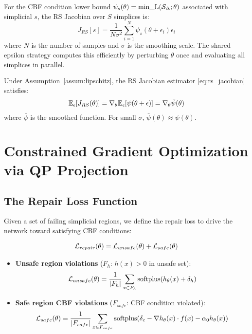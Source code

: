 \begin{protocol}
    \label{prot:rs_jacobian}
    For the CBF condition lower bound $\psi_s(\theta) = \text{min\_L}(\mathcal{S}_\Delta; \theta)$ associated with simplicial $s$, the RS Jacobian over $S$ simplices is:
    \begin{equation}
        J_{RS}[s] = \frac{1}{N \sigma^2} \sum_{i=1}^N \psi_s(\theta + \epsilon_i) \epsilon_i
        \label{eq:rs_cbf_jacobian}
    \end{equation}
    where $N$ is the number of samples and $\sigma$ is the smoothing scale. The shared epsilon strategy computes this efficiently by perturbing $\theta$ once and evaluating all simplices in parallel.
\end{protocol}

\begin{property}
    Under Assumption~\ref{assum:lipschitz}, the RS Jacobian estimator \eqref{eq:rs_jacobian} satisfies:
    \begin{equation}
        \mathbb{E}_\epsilon[J_{RS}(\theta)] = \nabla_\theta \mathbb{E}_\epsilon[\psi(\theta + \epsilon)] = \nabla_\theta \bar{\psi}(\theta)
        \label{eq:rs_unbiased}
    \end{equation}
    where $\bar{\psi}$ is the smoothed function. For small $\sigma$, $\bar{\psi}(\theta) \approx \psi(\theta)$.
\end{property}

\section{Constrained Gradient Optimization via QP Projection}

\subsection{The Repair Loss Function}

Given a set of failing simplicial regions, we define the repair loss to drive the network toward satisfying CBF conditions:

\begin{equation}
    \mathcal{L}_{repair}(\theta) = \mathcal{L}_{unsafe}(\theta) + \mathcal{L}_{safe}(\theta)
    \label{eq:repair_loss}
\end{equation}

\begin{itemize}
    \item \textbf{Unsafe region violations} ($F_h$: $h(x) > 0$ in unsafe set):
    \begin{equation}
        \mathcal{L}_{unsafe}(\theta) = \frac{1}{|F_h|} \sum_{x \in F_h} \text{softplus}(h_\theta(x) + \delta_h)
        \label{eq:loss_unsafe}
    \end{equation}
    \item \textbf{Safe region CBF violations} ($F_{safe}$: CBF condition violated):
    \begin{equation}
        \mathcal{L}_{safe}(\theta) = \frac{1}{|F_{safe}|} \sum_{x \in F_{safe}} \text{softplus}(\delta_c - \nabla h_\theta(x) \cdot f(x) - \alpha_0 h_\theta(x))
        \label{eq:loss_safe}
    \end{equation}
\end{itemize}

